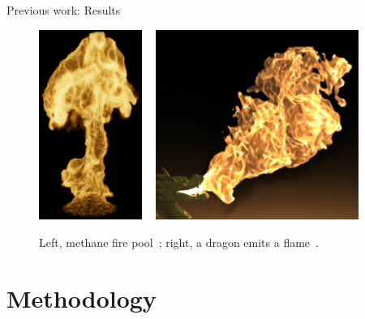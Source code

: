 \documentclass{beamer}
\begin{document}
\begin{frame}{Previous work: Results}

\begin{figure}[t!]
\begin{center}
\includegraphics[width=0.3\textwidth]{img/pegoraro_2006} 
~
\includegraphics[width=0.59\textwidth]{img/hong_2007}
\caption*{\tiny{Left, methane fire pool~\cite{Pegoraro:2006}; right, a dragon emits a flame~\cite{Hong:2007}.}}
\end{center}
\end{figure}

\end{frame}

\section{Methodology}
\subsection{ }
\end{document}
